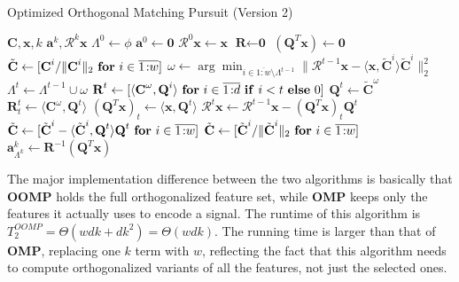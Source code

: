 \documentclass[12pt,a4paper,oneside,english]{UPBThesis}
\newcommand{\hcrange}[2]{\overline{{#1}\colon\!\!{#2}}}
\begin{document}
\begin{algorithm}
\caption{Optimized Orthogonal Matching Pursuit (Version 2)}
\label{algo:OptimizedOrthogonalMatchingPursuitV2}
\begin{algorithmic}
\Require $\textbf{C},\textbf{x},k$
\Ensure $\textbf{a}^k,\mathcal{R}^k\textbf{x}$
\State $\Lambda^0 \gets \phi$
\State $\textbf{a}^0 \gets \textbf{0}$
\State $\mathcal{R}^0\textbf{x} \gets \textbf{x}$
\State $\textbf{R} \gets \textbf{0}$
\State $(\textbf{Q}^T\textbf{x}) \gets \textbf{0}$
\State $\tilde{\textbf{C}} \gets [ \textbf{C}^i / \|\textbf{C}^i\|_2 ~ \mbox{\textbf{for} $i \in \hcrange{1}{w}$} ]$
\For {$t = \hcrange{1}{k}$}
\State $\omega \gets \arg\min_{i \in \hcrange{1}{w} \setminus \Lambda^{t-1}} \| \mathcal{R}^{t-1}\textbf{x} - \langle \textbf{x}, \tilde{\textbf{C}}^i \rangle \tilde{\textbf{C}}^i \|_2^2$  
\State $\Lambda^t \gets \Lambda^{t-1} \cup \omega$
\State $\textbf{R}^t \gets [ \langle \textbf{C}^\omega, \textbf{Q}^i \rangle~\mbox{\textbf{for} $i \in \hcrange{1}{d}$ \textbf{if} $i < t$ \textbf{else} $0$} ]$ 
\State $\textbf{Q}^t \gets \tilde{\textbf{C}}^\omega$
\State $\textbf{R}^t_t \gets \langle \textbf{C}^\omega, \textbf{Q}^t \rangle$
\State $(\textbf{Q}^T\textbf{x})_t \gets \langle \textbf{x}, \textbf{Q}^t \rangle$
\State $\mathcal{R}^t\textbf{x} \gets \mathcal{R}^{t-1}\textbf{x} -  (\textbf{Q}^T\textbf{x})_t \textbf{Q}^t$
\State $\tilde{\textbf{C}} \gets [ \tilde{\textbf{C}}^i - \langle \tilde{\textbf{C}}^i, \textbf{Q}^t \rangle \textbf{Q}^t ~ \mbox{\textbf{for} $i \in \hcrange{1}{w}$} ]$
\State $\tilde{\textbf{C}} \gets [ \tilde{\textbf{C}}^i / \| \tilde{\textbf{C}}^i \|_2 ~ \mbox{\textbf{for} $i \in \hcrange{1}{w}$} ]$
\EndFor
\State $\textbf{a}_{\Lambda^k}^k \gets \textbf{R}^{-1}(\textbf{Q}^T\textbf{x})$
\end{algorithmic}
\end{algorithm}

The major implementation difference between the two algorithms is basically that \textbf{OOMP} holds the full orthogonalized feature set, while \textbf{OMP} keeps only the features it actually uses to encode a signal. The runtime of this algorithm is $T_2^{OOMP} = \Theta(wdk + dk^2) = \Theta(wdk)$. The running time is larger than that of \textbf{OMP}, replacing one $k$ term with $w$, reflecting the fact that this algorithm needs to compute orthogonalized variants of all the features, not just the selected ones.
\end{document}
